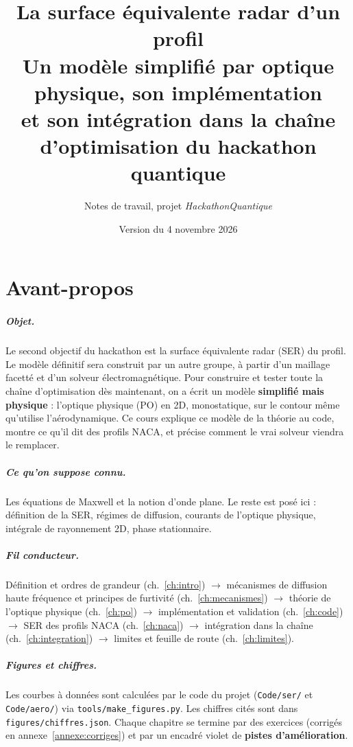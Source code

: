 \documentclass[11pt,a4paper]{report}
\title{\textbf{La surface équivalente radar d'un profil}\\[0.4em]\large Un modèle simplifié par optique physique, son implémentation\\ et son intégration dans la chaîne d'optimisation du hackathon quantique}
\author{Notes de travail, projet \emph{HackathonQuantique}}
\date{Version du 4 novembre 2026}
\begin{document}
\maketitle
{}

\chapter*{Avant-propos}
\paragraph{Objet.} Le second objectif du hackathon est la surface équivalente radar (SER) du profil. Le modèle définitif sera construit par un autre groupe, à partir d'un maillage facetté et d'un solveur électromagnétique. Pour construire et tester toute la chaîne d'optimisation dès maintenant, on a écrit un modèle \textbf{simplifié mais physique} : l'optique physique (PO) en 2D, monostatique, sur le contour même qu'utilise l'aérodynamique. Ce cours explique ce modèle de la théorie au code, montre ce qu'il dit des profils NACA, et précise comment le vrai solveur viendra le remplacer.

\paragraph{Ce qu'on suppose connu.} Les équations de Maxwell et la notion d'onde plane. Le reste est posé ici : définition de la SER, régimes de diffusion, courants de l'optique physique, intégrale de rayonnement 2D, phase stationnaire.

\paragraph{Fil conducteur.} Définition et ordres de grandeur (ch.~\ref{ch:intro}) $\to$ mécanismes de diffusion haute fréquence et principes de furtivité (ch.~\ref{ch:mecanismes}) $\to$ théorie de l'optique physique (ch.~\ref{ch:po}) $\to$ implémentation et validation (ch.~\ref{ch:code}) $\to$ SER des profils NACA (ch.~\ref{ch:naca}) $\to$ intégration dans la chaîne (ch.~\ref{ch:integration}) $\to$ limites et feuille de route (ch.~\ref{ch:limites}).

\paragraph{Figures et chiffres.} Les courbes à données sont calculées par le code du projet (\texttt{Code/ser/} et \texttt{Code/aero/}) via \texttt{tools/make\_figures.py}. Les chiffres cités sont dans \texttt{figures/chiffres.json}. Chaque chapitre se termine par des exercices (corrigés en annexe~\ref{annexe:corriges}) et par un encadré violet de \textbf{pistes d'amélioration}.
\end{document}
